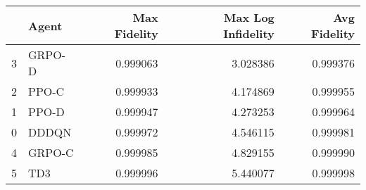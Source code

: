 \begin{tabular}{llrrr}
\toprule
 & Agent & Max Fidelity & Max Log Infidelity & Avg Fidelity \\
\midrule
3 & GRPO-D & 0.999063 & 3.028386 & 0.999376 \\
2 & PPO-C & 0.999933 & 4.174869 & 0.999955 \\
1 & PPO-D & 0.999947 & 4.273253 & 0.999964 \\
0 & DDDQN & 0.999972 & 4.546115 & 0.999981 \\
4 & GRPO-C & 0.999985 & 4.829155 & 0.999990 \\
5 & TD3 & 0.999996 & 5.440077 & 0.999998 \\
\bottomrule
\end{tabular}
